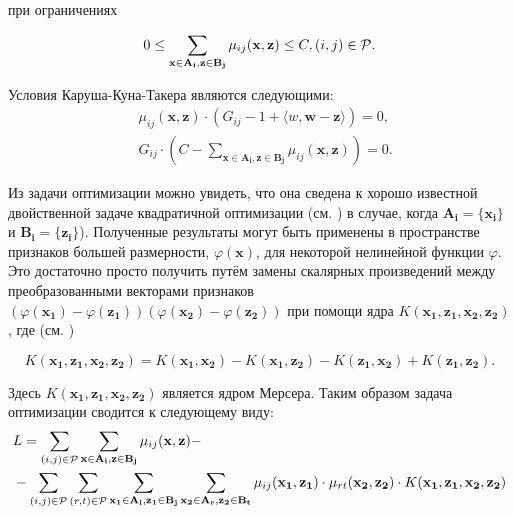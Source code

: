 \documentclass[12pt,a4paper,oneside]{article}
\begin{document}
\par
при ограничениях

\[
0 \leq \sum \limits_{\mathbf{x} \in \mathbf{A_i}, \mathbf{z} \in \mathbf{B_j}} \mu_{ij} (\mathbf{x}, \mathbf{z}) \leq C, (i, j) \in \mathcal{P}.
\]

\par
Условия Каруша-Куна-Такера являются следующими:
\mbox{}
\begin{eqnarray*}
&\mu_{ij}(\mathbf{x}, \mathbf{z}) \cdot (G_{ij} - 1 + \langle w, \mathbf{w} - \mathbf{z} \rangle) = 0,\\
&G_{ij} \cdot (C - \sum \limits_{\mathbf{x} \in \mathbf{A_i}, \mathbf{z} \in \mathbf{B_j}} \mu_{ij} (\mathbf{x}, \mathbf{z})) = 0.
\end{eqnarray*}

\par
Из задачи оптимизации можно увидеть, что она сведена к хорошо известной двойственной задаче квадратичной оптимизации (см. ) в случае, когда \(\mathbf{A_i} = \{\mathbf{x_i}\}\) и \(\mathbf{B_i} = \{\mathbf{z_i}\}\)). 
Полученные результаты могут быть применены в пространстве признаков большей размерности, \(\varphi(\mathbf{x})\), для некоторой нелинейной функции \(\varphi\). 
Это достаточно просто получить путём замены скалярных произведений между преобразованными векторами признаков \((\varphi(\mathbf{x_1}) - \varphi(\mathbf{z_1})) (\varphi(\mathbf{x_2}) - \varphi(\mathbf{z_2}))\) при помощи ядра \(K(\mathbf{x_1}, \mathbf{z_1}, \mathbf{x_2}, \mathbf{z_2})\), где (см. )

\[
K(\mathbf{x_1}, \mathbf{z_1}, \mathbf{x_2}, \mathbf{z_2}) = K(\mathbf{x_1}, \mathbf{x_2}) - K(\mathbf{x_1}, \mathbf{z_2}) - K(\mathbf{z_1}, \mathbf{x_2}) + K(\mathbf{z_1}, \mathbf{z_2}).
\]

\par
Здесь \(K(\mathbf{x_1}, \mathbf{z_1}, \mathbf{x_2}, \mathbf{z_2})\) является ядром Мерсера. 
Таким образом задача оптимизации сводится к следующему виду:
\mbox{}
\begin{eqnarray*}
&L = \sum \limits_{(i, j) \in \mathcal{P}} \sum \limits_{\mathbf{x} \in \mathbf{A_i}, \mathbf{z} \in \mathbf{B_j}} \mu_{ij} (\mathbf{x}, \mathbf{z}) - \\
&- \sum \limits_{(i, j) \in \mathcal{P}} \sum \limits_{(r, t) \in \mathcal{P}} \sum \limits_{\mathbf{x_1} \in \mathbf{A_i}, \mathbf{z_1} \in \mathbf{B_j}} \sum \limits_{\mathbf{x_2} \in \mathbf{A_r}, \mathbf{z_2} \in \mathbf{B_t}} \mu_{ij} (\mathbf{x_1}, \mathbf{z_1}) \cdot \mu_{rt} (\mathbf{x_2}, \mathbf{z_2}) \cdot K(\mathbf{x_1}, \mathbf{z_1}, \mathbf{x_2}, \mathbf{z_2})
\end{eqnarray*}
\end{document}
